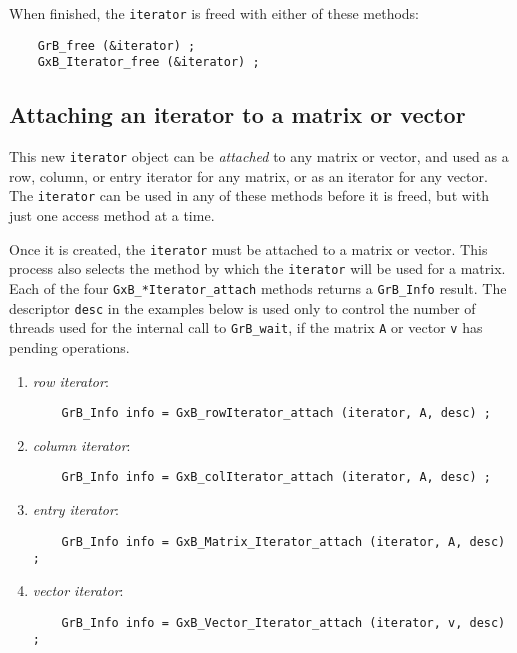 \documentclass[12pt]{article}
\begin{document}
{When finished, the \verb'iterator' is freed with either of these methods:

    {\footnotesize
    \begin{verbatim}
    GrB_free (&iterator) ;
    GxB_Iterator_free (&iterator) ; \end{verbatim}}

\subsection{Attaching an iterator to a matrix or vector}

This new \verb'iterator' object can be {\em attached} to any matrix or vector,
and used as a row, column, or entry iterator for any matrix, or as an iterator
for any vector.  The \verb'iterator' can be used in any of these methods before
it is freed, but with just one access method at a time.

Once it is created, the \verb'iterator' must be attached to a matrix or
vector.  This process also selects the method by which the \verb'iterator'
will be used for a matrix.  Each of the four \verb'GxB_*Iterator_attach'
methods returns a \verb'GrB_Info' result.  The descriptor \verb'desc' in the
examples below is used only to control the number of threads used for the
internal call to \verb'GrB_wait', if the matrix \verb'A' or vector \verb'v' has
pending operations.

    \begin{enumerate}
    \item {\em row iterator}: 
    {\footnotesize
    \begin{verbatim}
    GrB_Info info = GxB_rowIterator_attach (iterator, A, desc) ; \end{verbatim}}
    \item {\em column iterator}: 
    {\footnotesize
    \begin{verbatim}
    GrB_Info info = GxB_colIterator_attach (iterator, A, desc) ; \end{verbatim}}
    \item {\em entry iterator}:
    {\footnotesize
    \begin{verbatim}
    GrB_Info info = GxB_Matrix_Iterator_attach (iterator, A, desc) ; \end{verbatim}}
    \item {\em vector iterator}:
    {\footnotesize
    \begin{verbatim}
    GrB_Info info = GxB_Vector_Iterator_attach (iterator, v, desc) ; \end{verbatim}}
    \end{enumerate}

}
\end{document}
